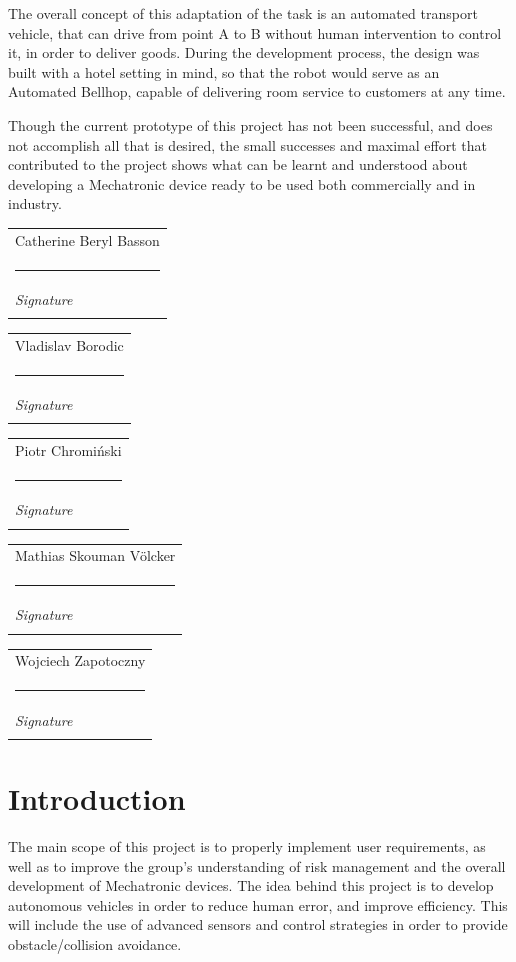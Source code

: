\documentclass[11pt]{article}
\makeatletter
\newcommand{\namesigdate}[2][5cm]{%
	\begin{tabular}{@{}p{#1}@{}}
		#2 \\[2\normalbaselineskip] \hrule \\[0pt]
		{\small \textit{Signature}} \\[2\normalbaselineskip] \\[0pt]
	\end{tabular}
}
\makeatother
\begin{document}
The overall concept of this adaptation of the task is an automated transport vehicle, that can drive from point A to B without human intervention to control it, in order to deliver goods. During the development process, the design was built with a hotel setting in mind, so that the robot would serve as an Automated Bellhop, capable of delivering room service to customers at any time.

Though the current prototype of this project has not been successful, and does not accomplish all that is desired, the small successes and maximal effort that contributed to the project shows what can be learnt and understood about developing a Mechatronic device ready to be used both commercially and in industry.
\newline
\newline
\newline

\noindent \namesigdate[6cm]{Catherine Beryl Basson} \hfill \namesigdate[6cm]{Vladislav Borodic}

\noindent \namesigdate[6cm]{Piotr Chromi\'nski} \hfill \namesigdate[6cm]{Mathias Skouman V\"olcker}


\noindent \namesigdate[6cm]{Wojciech Zapotoczny} \hfill
\newpage
\tableofcontents
{}
\lstset{style=customc}

\lstset{style=customc}
\newpage
{}
\section{Introduction}
The main scope of this project is to properly implement user requirements, as well as to improve the group’s understanding of risk management and the overall development of Mechatronic devices. The idea behind this project is to develop autonomous vehicles in order to reduce human error, and improve efficiency. This will include the use of advanced sensors and control strategies in order to provide obstacle/collision avoidance.
\end{document}
